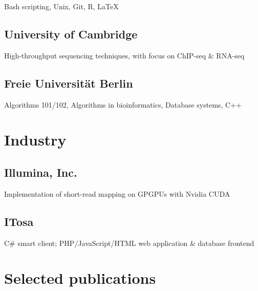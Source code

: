 \documentclass{klmr-cv}
\newcommand*\csharp{C\#}
\newcommand*\cpp{C++}
\begin{document}
\date{2011--2015}
\item{}
\item{Bash scripting, Unix, Git, R, \LaTeX}

\subsection{University of Cambridge}

\date{2013--2015}
\item{}
\item{High-throughput sequencing techniques, with focus on ChIP-seq \& RNA-seq}

\subsection{Freie Universität Berlin}

\date{2008--2011}
\item{}
\item{Algorithms 101/102, Algorithms in bioinformatics, Database systems, \cpp}

\section{Industry}

\subsection{Illumina, Inc.}

\date{Oct 2008--Feb 2009}
\item{}
\item{Implementation of short-read mapping on GPGPUs with Nvidia CUDA}

\subsection{ITosa}

\date{Jan 2007--Jan 2008}
\item{}
\item{\csharp{} smart client; PHP/JavaScript/HTML web application \& database
    frontend}

\section{Selected publications}
\end{document}
